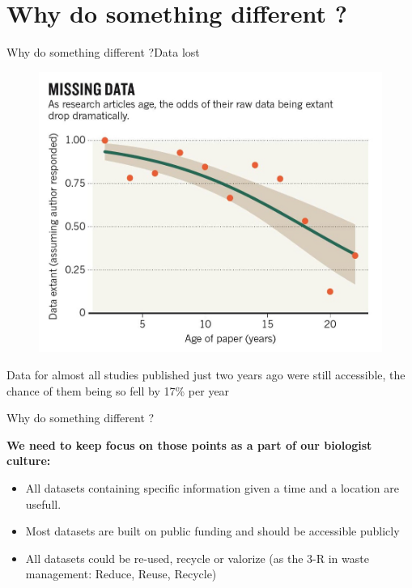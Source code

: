 \documentclass{eecslides}
\begin{document}
\section{Why do something different ?}


\begin{frame}{Why do something different ?}{Data lost}

\begin{figure}[t]
\includegraphics[width=0.50\paperwidth]{Nature_fig.jpg}
\end{figure}

 Data for almost all studies published just two years ago were still accessible, the chance of them being so \alert{fell by 17\% per year}

\end{frame}


\begin{frame}{Why do something different ?}

\textbf{We need to keep focus on those points as a part of our biologist culture:}
	
	\begin{itemize}
		\item \alert{All datasets} containing specific information given a time and a location \alert{are usefull}.
		\item Most datasets are built on \alert{public funding} and should be accessible publicly
		\item All datasets could be re-used, recycle or valorize (as the 3-R in waste management: Reduce, Reuse, Recycle) 
	\end{itemize}


\end{frame}






%	
%		
\end{document}
